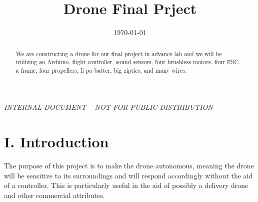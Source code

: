 \documentclass[aps,prl,twocolumn,showpacs,superscriptaddress,groupedaddress]{revtex4}  %
\begin{document}
\widetext
{}
\bigskip
\centerline{\em INTERNAL DOCUMENT -- NOT FOR PUBLIC DISTRIBUTION}


\title{Drone Final Prject}     %
\date{\today}


\begin{abstract}
We are constructing a drone for our final project in advance lab and we will be utilizing an Arduino, flight controller, sound sensors, four brushless motors, four ESC, a frame, four propellers, li po batter, big zipties, and many wires.
\end{abstract}
\maketitle

\section{\label{sec: level1}I. Introduction}
The purpose of this project is to make the drone autonomous, meaning the drone will be sensitive to its surroundings and will respond accordingly without the aid of a controller. This is particularly useful in the aid of possibly a delivery drone and other commercial attributes. 
\end{document}
